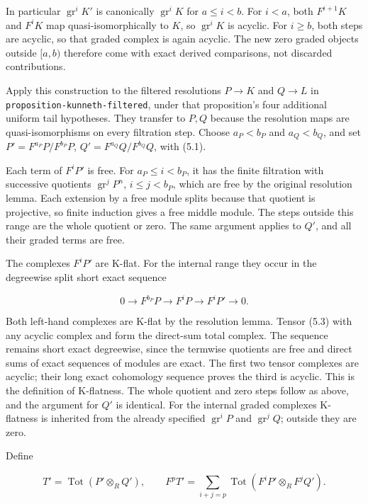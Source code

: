 \documentclass[11pt]{article}
\begin{document}
In particular \(\operatorname{gr}^iK'\) is canonically \(\operatorname{gr}^iK\) for \(a\leq i<b\). For \(i<a\), both \(F^{i+1}K\) and \(F^iK\) map quasi-isomorphically to \(K\), so \(\operatorname{gr}^iK\) is acyclic. For \(i\geq b\), both steps are acyclic, so that graded complex is again acyclic. The new zero graded objects outside \([a,b)\) therefore come with exact derived comparisons, not discarded contributions.

Apply this construction to the filtered resolutions \(P\to K\) and \(Q\to L\) in \texttt{proposition-kunneth-filtered}, under that proposition's four additional uniform tail hypotheses. They transfer to \(P,Q\) because the resolution maps are quasi-isomorphisms on every filtration step. Choose \(a_P<b_P\) and \(a_Q<b_Q\), and set \(P'=F^{a_P}P/F^{b_P}P\), \(Q'=F^{a_Q}Q/F^{b_Q}Q\), with (5.1).

Each term of \(F^iP'\) is free. For \(a_P\leq i<b_P\), it has the finite filtration with successive quotients \(\operatorname{gr}^jP^n\), \(i\leq j<b_P\), which are free by the original resolution lemma. Each extension by a free module splits because that quotient is projective, so finite induction gives a free middle module. The steps outside this range are the whole quotient or zero. The same argument applies to \(Q'\), and all their graded terms are free.

The complexes \(F^iP'\) are K-flat. For the internal range they occur in the degreewise split short exact sequence

\[
0\to F^{b_P}P\to F^iP\to F^iP'\to0.          \tag{5.3}
\]

Both left-hand complexes are K-flat by the resolution lemma. Tensor (5.3) with any acyclic complex and form the direct-sum total complex. The sequence remains short exact degreewise, since the termwise quotients are free and direct sums of exact sequences of modules are exact. The first two tensor complexes are acyclic; their long exact cohomology sequence proves the third is acyclic. This is the definition of K-flatness. The whole quotient and zero steps follow as above, and the argument for \(Q'\) is identical. For the internal graded complexes K-flatness is inherited from the already specified \(\operatorname{gr}^iP\) and \(\operatorname{gr}^jQ\); outside they are zero.

Define

\[
T'=\operatorname{Tot}(P'\otimes_R Q'),\qquad
F^pT'=\sum_{i+j=p}\operatorname{Tot}(F^iP'\otimes_R F^jQ').       \tag{5.4}
\]
\end{document}
